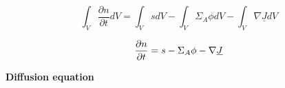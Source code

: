 \documentclass[aspectratio=1610,pdftex,dvipsnames,compress,xcolor={dvipsnames}]{beamer}
\begin{document}
\begin{frame}[plain]{}
    \LARGE
    \begin{equation*}
        \int_V \frac{\partial{n}}{\partial{t}} dV = 
        \int_V s dV - \int_V \Sigma_A \phi dV - \int_V \nabla \underline{J} dV
    \end{equation*}
\end{frame}


\begin{frame}[plain]{}
    \begin{equation}
        \LARGE
        \frac{\partial{n}}{\partial{t}} = s - \Sigma_A \phi - \nabla \underline{J}
    \end{equation}
\end{frame}


\begin{frame}[plain]{}
    \centering\LARGE\textbf{Diffusion equation}
\end{frame}
\end{document}
